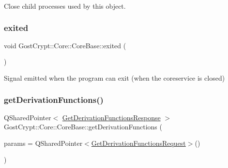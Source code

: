 Close child processes used by this object. 

\mbox{\label{class_gost_crypt_1_1_core_1_1_core_base_a92f0c8dd264e1fb1e9f638a6c279ce28}} 
\subsubsection{\texorpdfstring{exited}{exited}}
{\footnotesize\ttfamily void Gost\+Crypt\+::\+Core\+::\+Core\+Base\+::exited (\begin{DoxyParamCaption}{ }\end{DoxyParamCaption})\hspace{0.3cm}{\ttfamily [signal]}}



Signal emitted when the program can exit (when the coreservice is closed) 

\mbox{\label{class_gost_crypt_1_1_core_1_1_core_base_a2b55f015a063b69a371aa0136aa82434}} 
\subsubsection{\texorpdfstring{get\+Derivation\+Functions()}{getDerivationFunctions()}}
{\footnotesize\ttfamily Q\+Shared\+Pointer$<$ \hyperlink{struct_gost_crypt_1_1_core_1_1_get_derivation_functions_response}{Get\+Derivation\+Functions\+Response} $>$ Gost\+Crypt\+::\+Core\+::\+Core\+Base\+::get\+Derivation\+Functions (\begin{DoxyParamCaption}\item[{Q\+Shared\+Pointer$<$ \hyperlink{struct_gost_crypt_1_1_core_1_1_get_derivation_functions_request}{Get\+Derivation\+Functions\+Request} $>$}]{params = {\ttfamily QSharedPointer$<$\hyperlink{struct_gost_crypt_1_1_core_1_1_get_derivation_functions_request}{Get\+Derivation\+Functions\+Request}$>$()} }\end{DoxyParamCaption})\hspace{0.3cm}{\ttfamily [protected]}}



